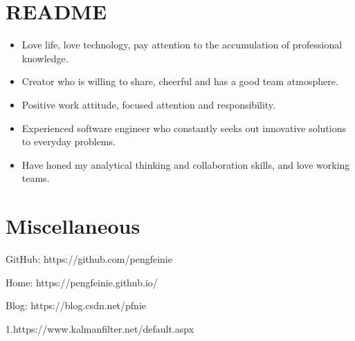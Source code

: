 \documentclass[eng]{ajceam-class}
\begin{document}
\section{README}
\begin{itemize}
\item Love life, love technology, pay attention to the accumulation of professional knowledge.
\item Creator who is willing to share, cheerful and has a good team atmosphere.
\item Positive work attitude, focused attention and responsibility.
\item Experienced software engineer who constantly seeks out innovative solutions to everyday problems.
\item Have honed my analytical thinking and collaboration skills, and love working teams.
\end{itemize}
\section{Miscellaneous}
\item GitHub: https://github.com/pengfeinie
\item Home: https://pengfeinie.github.io/
\item Blog: https://blog.csdn.net/pfnie

1.\quad https://www.kalmanfilter.net/default.aspx
\end{document}
